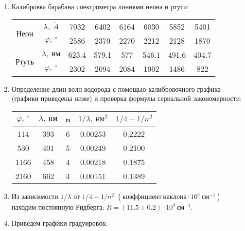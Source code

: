 \documentclass{lab}
\renewcommand{\AA}{\ensuremath{\mathring{A}}}
\begin{document}
\begin{enumerate}

\item
Калибровка барабана спектрометра линиями неона и ртути:
\begin{table}[H]
	\centering
	\begin{tabular}{|cc|cccccc|}
	\hline
	\multirow{2}{2cm}{Неон}  & $\lambda,~\AA{}$ & 7032 & 6402 & 6164 & 6030 & 5852 & 5401 \\
	                         & $\varphi,~^{\circ}$ & 2586 & 2370 & 2270 & 2212 & 2128 & 1870 \\ \hline
	\multirow{2}{2cm}{Ртуть} & $\lambda,~нм$    & 623.4& 579.1& 577  & 546.1& 491.6& 404.7\\
	                         & $\varphi,~^{\circ}$ & 2302 & 2094 & 2084 & 1902 & 1486 & 822  \\
	\hline
		
	\end{tabular}
	\label{tab1}
\end{table}

\item 
Определение длин волн водорода с помощью калибровочного графика (графики приведены ниже) и проверка формулы сериальной закономерности:
\begin{table}[H]
	\centering
	\begin{tabular}{|ccccc|}
		\hline
		$\varphi,~^{\circ}$ & $\lambda,~нм$ & n & $1/\lambda,~нм^2$ & $1/4 - 1/n^2$ \\ \hline
		114  & 393 & 6 & 0.00253 & 0.2222 \\
		530  & 401 & 5 & 0.00249 & 0.2100 \\
		1166 & 458 & 4 & 0.00218 & 0.1875 \\
		2160 & 662 & 3 & 0.00151 & 0.1389 \\
		\hline
		
	\end{tabular}
	\label{tab2}
\end{table}

\item 
Из зависимости $ 1/\lambda $ от $ 1/4 - 1/n^2 $ $(коэффициент~наклона \cdot 10^4~см^{-1})$ находим постоянную Ридберга: $ R = (11.5 \pm 0.2) \cdot 10^4 ~ см^{-1} $.

\item
Приведем графики градуировок:
\begin{figure}[H]
	\centering
\end{figure}
\end{enumerate}
\end{document}
